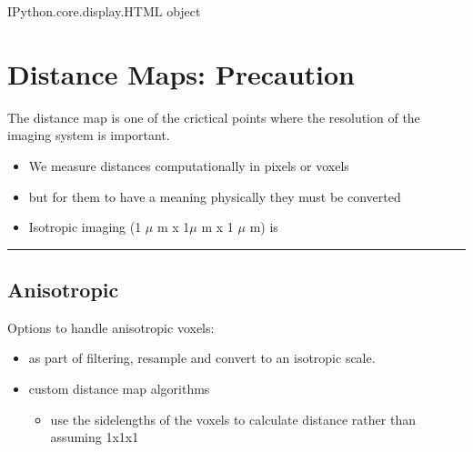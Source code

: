 \documentclass[letterpaper,10pt,english]{sphinxmanual}
\begin{document}
\begin{sphinxVerbatim}[commandchars=\\\{\}]
\PYGZlt{}IPython.core.display.HTML object\PYGZgt{}
\end{sphinxVerbatim}


\section{Distance Maps: Precaution}
\label{\detokenize{06-AdvancedShapeAndTexture:distance-maps-precaution}}
\sphinxAtStartPar
The distance map is one of the crictical points where the resolution of the imaging system is important.
\begin{itemize}
\item {} 
\sphinxAtStartPar
We measure distances computationally in pixels or voxels

\item {} 
\sphinxAtStartPar
but for them to have a meaning physically they must be converted

\item {} 
\sphinxAtStartPar
Isotropic imaging (1 \(\mu\) m x 1\(\mu\) m x 1 \(\mu\) m) is 

\end{itemize}


\bigskip\hrule\bigskip



\subsection{Anisotropic}
\label{\detokenize{06-AdvancedShapeAndTexture:anisotropic}}
\sphinxAtStartPar
Options to handle anisotropic voxels:
\begin{itemize}
\item {} 
\sphinxAtStartPar
as part of filtering, resample and convert to an isotropic scale.

\item {} 
\sphinxAtStartPar
custom distance map algorithms
\begin{itemize}
\item {} 
\sphinxAtStartPar
use the side\sphinxhyphen{}lengths of the voxels to calculate distance rather than assuming 1x1x1

\end{itemize}

\end{itemize}
\end{document}

